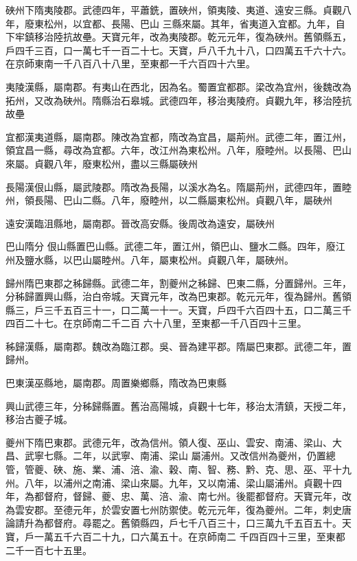 \begin{pinyinscope}
 硤州下隋夷陵郡。武德四年，平蕭銑，置硤州，領夷陵、夷道、遠安三縣。貞觀八年，廢東松州，以宜都、長陽、巴山
 三縣來屬。其年，省夷道入宜都。九年，自下牢鎮移治陸抗故壘。天寶元年，改為夷陵郡。乾元元年，復為硤州。舊領縣五，戶四千三百，口一萬七千一百二十七。天寶，戶八千九十八，口四萬五千六十六。在京師東南一千八百八十八里，至東都一千六百四十六里。



 夷陵漢縣，屬南郡。有夷山在西北，因為名。蜀置宜都郡。梁改為宜州，後魏改為拓州，又改為硤州。隋縣治石皋城。武德四年，移治夷陵府。貞觀九年，移治陸抗故壘



 宜都漢夷道縣，屬南郡。陳改為宜都，隋改為宜昌，屬荊州。武德二年，置江州，領宜昌一縣，尋改為宜都。六年，改江州為東松州。八年，廢睦州。以長陽、巴山來屬。貞觀八年，廢東松州，盡以三縣屬硤州



 長陽漢佷山縣，屬武陵郡。隋改為長陽，以溪水為名。隋屬荊州，武德四年，置睦州，領長陽、巴山二縣。八年，廢睦州，以二縣屬東松州。貞觀八年，屬硤州



 遠安漢臨沮縣地，屬南郡。晉改高安縣。後周改為遠安，屬硤州



 巴山隋分
 佷山縣置巴山縣。武德二年，置江州，領巴山、鹽水二縣。四年，廢江州及鹽水縣，以巴山屬睦州。八年，屬東松州。貞觀八年，屬硤州。



 歸州隋巴東郡之秭歸縣。武德二年，割夔州之秭歸、巴東二縣，分置歸州。三年，分秭歸置興山縣，治白帝城。天寶元年，改為巴東郡。乾元元年，復為歸州。舊領縣三，戶三千五百三十一，口二萬一十一。天寶，戶四千六百四十五，口二萬三千四百二十七。在京師南二千二百
 六十八里，至東都一千八百四十三里。



 秭歸漢縣，屬南郡。魏改為臨江郡。吳、晉為建平郡。隋屬巴東郡。武德二年，置歸州。



 巴東漢巫縣地，屬南郡。周置樂鄉縣，隋改為巴東縣



 興山武德三年，分秭歸縣置。舊治高陽城，貞觀十七年，移治太清鎮，天授二年，移治古夔子城。



 夔州下隋巴東郡。武德元年，改為信州。領人復、巫山、雲安、南浦、梁山、大昌、武寧七縣。二年，以武寧、南浦、梁山
 屬浦州。又改信州為夔州，仍置總管，管夔、硤、施、業、浦、涪、渝、穀、南、智、務、黔、克、思、巫、平十九州。八年，以浦州之南浦、梁山來屬。九年，又以南浦、梁山屬浦州。貞觀十四年，為都督府，督歸、夔、忠、萬、涪、渝、南七州。後罷都督府。天寶元年，改為雲安郡。至德元年，於雲安置七州防禦使。乾元元年，復為夔州。二年，刺史唐論請升為都督府。尋罷之。舊領縣四，戶七千八百三十，口三萬九千五百五十。天寶，戶一萬五千六百二十九，口六萬五十。在京師南二
 千四百四十三里，至東都二千一百七十五里。




\end{pinyinscope}
